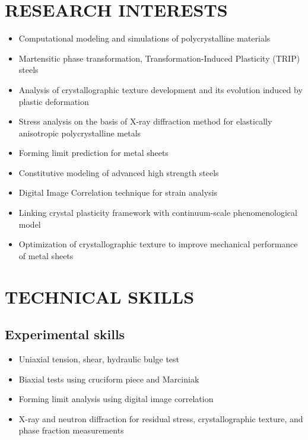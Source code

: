 \documentclass{res}
\begin{document}
\begin{resume}
  \section{RESEARCH INTERESTS}
  \begin{itemize}
  \item Computational modeling and simulations of polycrystalline materials
  \item Martensitic phase transformation, Transformation-Induced Plasticity (TRIP) steels
  \item Analysis of crystallographic texture development and its evolution induced by plastic deformation
  \item Stress analysis on the basis of X-ray diffraction method for elastically anisotropic polycrystalline metals
  \item Forming limit prediction for metal sheets
  \item Constitutive modeling of advanced high strength steels
  \item Digital Image Correlation technique for strain analysis
  \item Linking crystal plasticity framework with continuum-scale phenomenological model
  \item Optimization of crystallographic texture to improve mechanical performance of metal sheets
  \end{itemize}

  \section{TECHNICAL SKILLS}
  \subsection{Experimental skills}
  \begin{itemize}
  \item Uniaxial tension, shear, hydraulic bulge test
  \item Biaxial tests using cruciform piece and Marciniak
  \item Forming limit analysis using digital image correlation
  \item X-ray and neutron diffraction for residual stress, crystallographic texture, and phase fraction measurements
  \end{itemize}

\end{resume}
\end{document}
